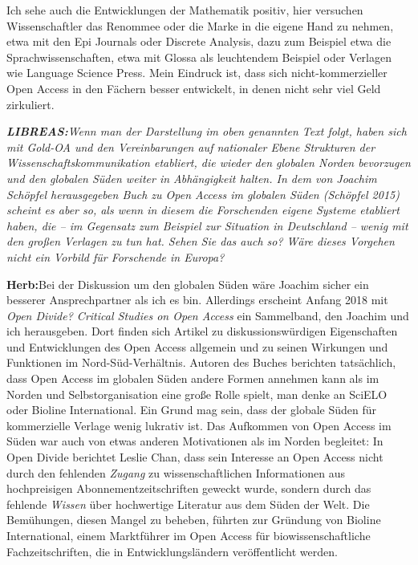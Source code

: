 \documentclass[a4paper,
fontsize=11pt,
oneside,
numbers=noperiodatend,
parskip=half-,
bibliography=totoc,
final
]{scrartcl}
\begin{document}
Ich sehe auch die Entwicklungen der Mathematik positiv, hier versuchen
Wissenschaftler das Renommee oder die Marke in die eigene Hand zu
nehmen, etwa mit den Epi Journals oder Discrete Analysis, dazu zum
Beispiel etwa die Sprachwissenschaften, etwa mit Glossa als leuchtendem
Beispiel oder Verlagen wie Language Science Press. Mein Eindruck ist,
dass sich nicht-kommerzieller Open Access in den Fächern besser
entwickelt, in denen nicht sehr viel Geld zirkuliert.

\emph{\textbf{LIBREAS:}Wenn man der Darstellung im oben genannten Text
folgt, haben sich mit Gold-OA und den Vereinbarungen auf nationaler
Ebene Strukturen der Wissenschaftskommunikation etabliert, die wieder
den globalen Norden bevorzugen und den globalen Süden weiter in
Abhängigkeit halten. In dem von Joachim Schöpfel herausgegeben Buch zu
Open Access im globalen Süden (Schöpfel 2015) scheint es aber so, als
wenn in diesem die Forschenden eigene Systeme etabliert haben, die -- im
Gegensatz zum Beispiel zur Situation in Deutschland -- wenig mit den
großen Verlagen zu tun hat. Sehen Sie das auch so? Wäre dieses Vorgehen
nicht ein Vorbild für Forschende in Europa?}

\textbf{Herb:}Bei der Diskussion um den globalen Süden wäre Joachim
sicher ein besserer Ansprechpartner als ich es bin. Allerdings erscheint
Anfang 2018 mit \emph{Open Divide? Critical Studies on Open Access} ein
Sammelband, den Joachim und ich herausgeben. Dort finden sich Artikel zu
diskussionswürdigen Eigenschaften und Entwicklungen des Open Access
allgemein und zu seinen Wirkungen und Funktionen im Nord-Süd-Verhältnis.
Autoren des Buches berichten tatsächlich, dass Open Access im globalen
Süden andere Formen annehmen kann als im Norden und Selbstorganisation
eine große Rolle spielt, man denke an SciELO oder Bioline International.
Ein Grund mag sein, dass der globale Süden für kommerzielle Verlage
wenig lukrativ ist. Das Aufkommen von Open Access im Süden war auch von
etwas anderen Motivationen als im Norden begleitet: In Open Divide
berichtet Leslie Chan, dass sein Interesse an Open Access nicht durch
den fehlenden \emph{Zugang} zu wissenschaftlichen Informationen aus
hochpreisigen Abonnementzeitschriften geweckt wurde, sondern durch das
fehlende \emph{Wissen} über hochwertige Literatur aus dem Süden der
Welt. Die Bemühungen, diesen Mangel zu beheben, führten zur Gründung von
Bioline International, einem Marktführer im Open Access für
biowissenschaftliche Fachzeitschriften, die in Entwicklungsländern
veröffentlicht werden.
\end{document}
